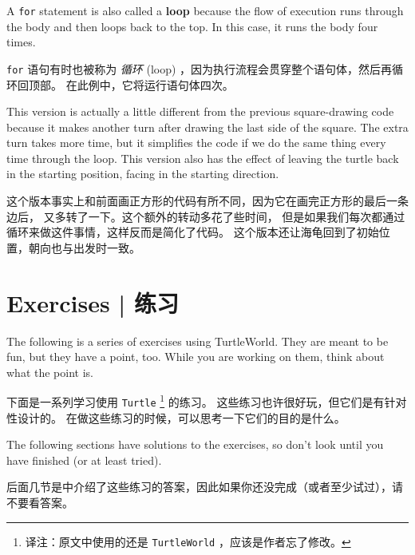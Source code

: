 A {\tt for} statement is also called a {\bf loop} because
the flow of execution runs through the body and then loops back
to the top.  In this case, it runs the body four times.

\lstinline{for} 语句有时也被称为 \emph{循环} (loop) ，因为执行流程会贯穿整个语句体，然后再循环回顶部。
在此例中，它将运行语句体四次。


This version is actually a little different from the previous
square-drawing code because it makes another turn after
drawing the last side of the square.  The extra turn takes
more time, but it simplifies the code if we do the same thing
every time through the loop.  This version also has the effect
of leaving the turtle back in the starting position, facing in
the starting direction.

这个版本事实上和前面画正方形的代码有所不同，因为它在画完正方形的最后一条边后，
又多转了一下。这个额外的转动多花了些时间，
但是如果我们每次都通过循环来做这件事情，这样反而是简化了代码。
这个版本还让海龟回到了初始位置，朝向也与出发时一致。



\section{Exercises  |  练习}

The following is a series of exercises using TurtleWorld.  They
are meant to be fun, but they have a point, too.  While you are
working on them, think about what the point is.

下面是一系列学习使用 \lstinline{Turtle} \footnote{译注：原文中使用的还是 \lstinline{TurtleWorld} ，应该是作者忘了修改。} 的练习。
这些练习也许很好玩，但它们是有针对性设计的。
在做这些练习的时候，可以思考一下它们的目的是什么。

The following sections have solutions to the exercises, so
don't look until you have finished (or at least tried).

后面几节是中介绍了这些练习的答案，因此如果你还没完成（或者至少试过），请不要看答案。

